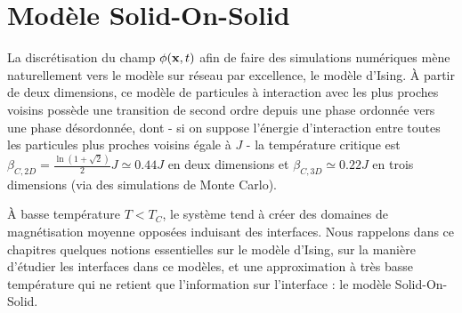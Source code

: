 \chapter{Modèle Solid-On-Solid}

La discrétisation du champ $\phi({\bf x},t)$ afin de faire des simulations numériques mène naturellement vers le modèle sur réseau par excellence, le modèle d'Ising. À partir de deux dimensions, ce modèle de particules à interaction avec les plus proches voisins possède une transition de second ordre depuis une phase ordonnée vers une phase désordonnée, dont - si on suppose l'énergie d'interaction entre toutes les particules plus proches voisins égale à $J$ - la température critique est $\beta_{C,2D} =  \frac{\ln(1+\sqrt{2})}{2} J \simeq 0.44 J$ en deux dimensions \cite{onsager_crystal_1944} et $\beta_{C,3D} \simeq 0.22 J$ en trois dimensions \cite{talapov_magnetization_1996} (via des simulations de Monte Carlo).

À basse température $T \less T_C$, le système tend à créer des domaines de magnétisation moyenne opposées induisant des interfaces. Nous rappelons dans ce chapitres quelques notions essentielles sur le modèle d'Ising, sur la manière d'étudier les interfaces dans ce modèles, et une approximation à très basse température qui ne retient que l'information sur l'interface : le modèle Solid-On-Solid.

